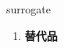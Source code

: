 
\begin{frame}
{\huge surrogate}
\begin{center}
\begin{enumerate}\Large
  \item \textbf{替代品}
\end{enumerate}
\end{center}
\end{frame}
